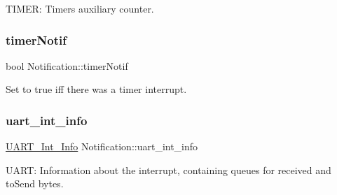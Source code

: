 T\+I\+M\+ER\+: Timer\textquotesingle{}s auxiliary counter. 

\mbox{\label{group__interrupts_gaba77f917764b3f473bccd4d28f9ab312}} 
\subsubsection{\texorpdfstring{timer\+Notif}{timerNotif}}
{\footnotesize\ttfamily bool Notification\+::timer\+Notif}



Set to true iff there was a timer interrupt. 

\mbox{\label{group__interrupts_ga440aaa950e50448a628bba417bce3ce7}} 
\subsubsection{\texorpdfstring{uart\+\_\+int\+\_\+info}{uart\_int\_info}}
{\footnotesize\ttfamily \mbox{\hyperlink{struct_u_a_r_t___int___info}{U\+A\+R\+T\+\_\+\+Int\+\_\+\+Info}} Notification\+::uart\+\_\+int\+\_\+info}



U\+A\+RT\+: Information about the interrupt, containing queues for received and to\+Send bytes. 

